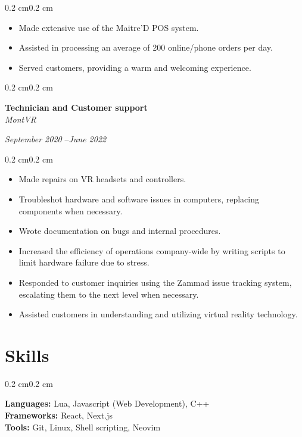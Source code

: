\documentclass[10pt, letterpaper]{article}
\newenvironment{highlights}{%
    \begin{itemize}[
        topsep=0.10 cm,%
        parsep=0.10 cm,%
        partopsep=0pt,%
        itemsep=0pt,%
        leftmargin=0.4 cm + 10pt%
    ]
}{%
    \end{itemize}%
}
\newenvironment{onecolentry}{%
    \begin{adjustwidth}{0.2 cm}{0.2 cm}%
}{%
    \end{adjustwidth}%
}
\newenvironment{twocolentry}[1]{%
    \begin{onecolentry}%
    \def\twocolentryarg{#1}%
    \noindent
    \begin{minipage}[t]{0.68\textwidth} %
}{%
    \end{minipage}\hfill%
    \begin{minipage}[t]{0.30\textwidth} %
      \raggedleft\twocolentryarg
    \end{minipage}%
    \vspace{0.2cm}%
    \end{onecolentry}%
}
\begin{document}
\vspace{0.10 cm}
\begin{onecolentry}
    \begin{highlights}
        \item Made extensive use of the Maitre'D POS system.
        \item Assisted in processing an average of 200 online/phone orders per day.
        \item Served customers, providing a warm and welcoming experience.
    \end{highlights}
\end{onecolentry}
\vspace{0.2 cm}
\begin{twocolentry}{%
\textit{September 2020 }--\textit{June 2022} \\[0.1cm]
\textit{}%
}
    \textbf{Technician and Customer support }\\
    \textit{MontVR }
\end{twocolentry}
\vspace{0.10 cm}
\begin{onecolentry}
    \begin{highlights}
        \item Made repairs on VR headsets and controllers.
        \item Troubleshot hardware and software issues in computers, replacing components when necessary.
        \item Wrote documentation on bugs and internal procedures.
        \item Increased the efficiency of operations company-wide by writing scripts to limit hardware failure due to stress.
        \item Responded to customer inquiries using the Zammad issue tracking system, escalating them to the next level when necessary.
        \item Assisted customers in understanding and utilizing virtual reality technology.
    \end{highlights}
\end{onecolentry}
\vspace{0.2 cm}


\section{Skills}
\begin{onecolentry}
    \textbf{Languages:} Lua, Javascript (Web Development), C++\\
    \textbf{Frameworks:} React, Next.js\\
    \textbf{Tools:} Git, Linux, Shell scripting, Neovim\\
\end{onecolentry}
\end{document}
